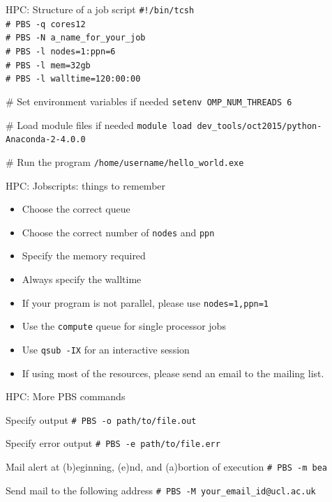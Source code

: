 \documentclass{beamer}
\begin{document}
\begin{frame}{HPC: Structure of a job script}
	\texttt{\#!/bin/tcsh \\
	\# PBS -q cores12 \\
	\# PBS -N a\_name\_for\_your\_job \\
	\# PBS -l nodes=1:ppn=6 \\
	\# PBS -l mem=32gb \\
	\# PBS -l walltime=120:00:00} \\
	
	\begin{block}{\# Set environment variables if needed}
	    \texttt{setenv OMP\_NUM\_THREADS 6}
        \end{block}
	\begin{block}{\# Load module files if needed}
	    \texttt{module load dev\_tools/oct2015/python-Anaconda-2-4.0.0}
        \end{block}
	\begin{block}{\# Run the program}
	    \texttt{/home/username/hello\_world.exe}
        \end{block}	
\end{frame}

\begin{frame}{HPC: Jobscripts: things to remember}
	\begin{itemize}
		\item Choose the correct queue
		\item Choose the correct number of \texttt{nodes} and \texttt{ppn}
		\item Specify the memory required
		\item Always specify the walltime
		\item If your program is not parallel, please use \texttt{nodes=1,ppn=1}
		\item Use the \texttt{compute} queue for single processor jobs
		\item Use \texttt{qsub -IX} for an interactive session
		\item If using most of the resources, please send an email to the mailing list.
	\end{itemize}
\end{frame}

\begin{frame}{HPC: More PBS commands}
	\begin{block}{Specify output}
	    \texttt{\# PBS -o path/to/file.out}
        \end{block}
	\begin{block}{Specify error output}
	    \texttt{\# PBS -e path/to/file.err}
        \end{block}
	\begin{block}{Mail alert at (b)eginning, (e)nd, and (a)bortion of execution}
	    \texttt{\# PBS -m bea}
        \end{block}
	\begin{block}{Send mail to the following address}
	    \texttt{\# PBS -M your\_email\_id@ucl.ac.uk}
        \end{block}                        
\end{frame}
\end{document}
